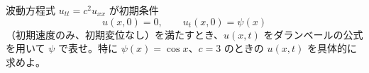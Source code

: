
波動方程式 $u_{tt} = c^{2} u_{xx}$ が初期条件
\[
u(x,0) = 0, \qquad u_{t}(x,0) = \psi(x)
\]
（初期速度のみ、初期変位なし）を満たすとき、$u(x,t)$ をダランベールの公式を用いて $\psi$ で表せ。特に $\psi(x) = \cos x$、$c = 3$ のときの $u(x,t)$ を具体的に求めよ。
